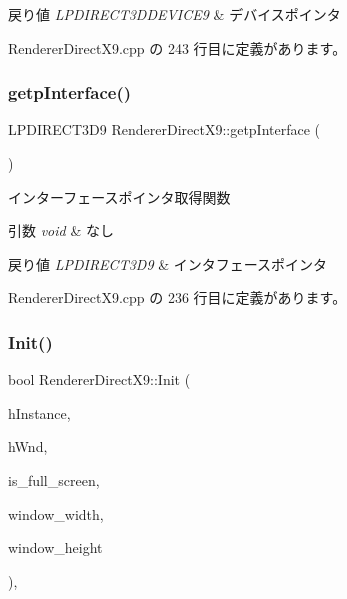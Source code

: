 \begin{DoxyRetVals}{戻り値}
{\em L\+P\+D\+I\+R\+E\+C\+T3\+D\+D\+E\+V\+I\+C\+E9} & デバイスポインタ \\
\hline
\end{DoxyRetVals}


 Renderer\+Direct\+X9.\+cpp の 243 行目に定義があります。

\mbox{\label{class_renderer_direct_x9_aad68389e45dd757dcde19d636f082a21}} 
\subsubsection{\texorpdfstring{getp\+Interface()}{getpInterface()}}
{\footnotesize\ttfamily L\+P\+D\+I\+R\+E\+C\+T3\+D9 Renderer\+Direct\+X9\+::getp\+Interface (\begin{DoxyParamCaption}{ }\end{DoxyParamCaption})}



インターフェースポインタ取得関数 


\begin{DoxyParams}{引数}
{\em void} & なし \\
\hline
\end{DoxyParams}

\begin{DoxyRetVals}{戻り値}
{\em L\+P\+D\+I\+R\+E\+C\+T3\+D9} & インタフェースポインタ \\
\hline
\end{DoxyRetVals}


 Renderer\+Direct\+X9.\+cpp の 236 行目に定義があります。

\mbox{\label{class_renderer_direct_x9_af015676b50f3ce1ba7cf20abf6074e3b}} 
\subsubsection{\texorpdfstring{Init()}{Init()}}
{\footnotesize\ttfamily bool Renderer\+Direct\+X9\+::\+Init (\begin{DoxyParamCaption}\item[{H\+I\+N\+S\+T\+A\+N\+CE}]{h\+Instance,  }\item[{H\+W\+ND}]{h\+Wnd,  }\item[{B\+O\+OL}]{is\+\_\+full\+\_\+screen,  }\item[{int}]{window\+\_\+width,  }\item[{int}]{window\+\_\+height }\end{DoxyParamCaption})\hspace{0.3cm}{\ttfamily [override]}, {\ttfamily [virtual]}}



